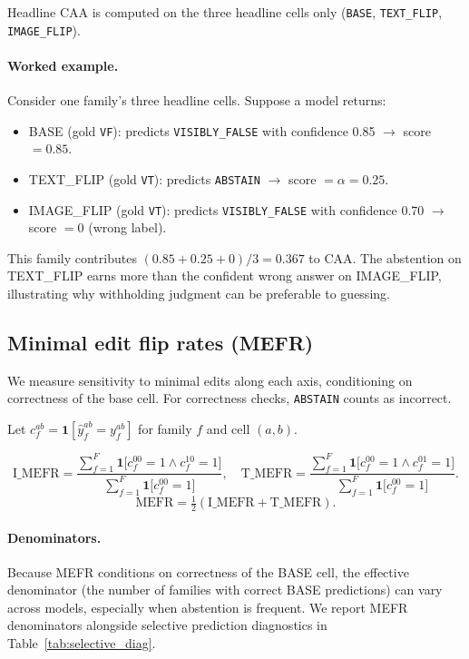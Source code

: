 \documentclass[11pt]{article}
\begin{document}
Headline CAA is computed on the three headline cells only (\texttt{BASE}, \texttt{TEXT\_FLIP}, \texttt{IMAGE\_FLIP}).

\paragraph{Worked example.}
Consider one family's three headline cells. Suppose a model returns:
\begin{itemize}[noitemsep, topsep=2pt]
  \item BASE (gold \texttt{VF}): predicts \texttt{VISIBLY\_FALSE} with confidence 0.85 $\to$ score $= 0.85$.
  \item TEXT\_FLIP (gold \texttt{VT}): predicts \texttt{ABSTAIN} $\to$ score $= \alpha = 0.25$.
  \item IMAGE\_FLIP (gold \texttt{VT}): predicts \texttt{VISIBLY\_FALSE} with confidence 0.70 $\to$ score $= 0$ (wrong label).
\end{itemize}
This family contributes $(0.85 + 0.25 + 0) / 3 = 0.367$ to CAA. The abstention on TEXT\_FLIP earns more than the confident wrong answer on IMAGE\_FLIP, illustrating why withholding judgment can be preferable to guessing.

\subsection{Minimal edit flip rates (MEFR)}

We measure sensitivity to minimal edits along each axis, conditioning on correctness of the base cell. For correctness checks, \texttt{ABSTAIN} counts as incorrect.

Let \(c^{ab}_f=\mathbf{1}[\hat{y}^{ab}_f=y^{ab}_f]\) for family \(f\) and cell \((a,b)\).

\[
\text{I\_MEFR}=
\frac{\sum_{f=1}^{F}\mathbf{1}\big[c^{00}_f=1 \land c^{10}_f=1\big]}
{\sum_{f=1}^{F}\mathbf{1}\big[c^{00}_f=1\big]},
\quad
\text{T\_MEFR}=
\frac{\sum_{f=1}^{F}\mathbf{1}\big[c^{00}_f=1 \land c^{01}_f=1\big]}
{\sum_{f=1}^{F}\mathbf{1}\big[c^{00}_f=1\big]}.
\]
\[
\text{MEFR}=\tfrac{1}{2}(\text{I\_MEFR}+\text{T\_MEFR}).
\]

\paragraph{Denominators.}
Because MEFR conditions on correctness of the BASE cell, the effective denominator (the number of families with correct BASE predictions) can vary across models, especially when abstention is frequent. We report MEFR denominators alongside selective prediction diagnostics in Table~\ref{tab:selective_diag}.
\end{document}
